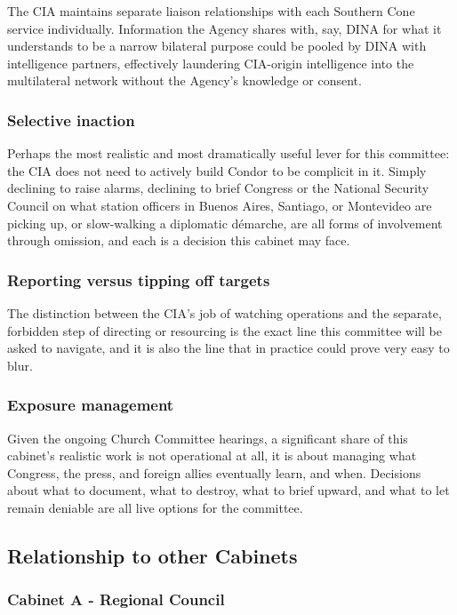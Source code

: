 The CIA maintains separate liaison relationships with each Southern Cone service individually. Information the Agency shares with, say, DINA for what it understands to be a narrow bilateral purpose could be pooled by DINA with intelligence partners, effectively laundering CIA-origin intelligence into the multilateral network without the Agency's knowledge or consent.

\subsubsection{Selective inaction}

Perhaps the most realistic and most dramatically useful lever for this committee: the CIA does not need to actively build Condor to be complicit in it. Simply declining to raise alarms, declining to brief Congress or the National Security Council on what station officers in Buenos Aires, Santiago, or Montevideo are picking up, or slow-walking a diplomatic démarche, are all forms of involvement through omission, and each is a decision this cabinet may face.

\subsubsection{Reporting versus tipping off targets}

The distinction between the CIA's job of watching operations and the separate, forbidden step of directing or resourcing is the exact line this committee will be asked to navigate, and it is also the line that in practice could prove very easy to blur.

\subsubsection{Exposure management}

Given the ongoing Church Committee hearings, a significant share of this cabinet's realistic work is not operational at all, it is about managing what Congress, the press, and foreign allies eventually learn, and when. Decisions about what to document, what to destroy, what to brief upward, and what to let remain deniable are all live options for the committee.

\subsection{Relationship to other Cabinets}

\subsubsection{Cabinet A - Regional Council}

